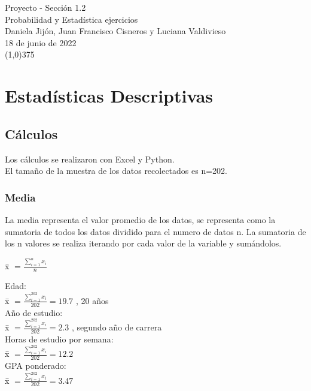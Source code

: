 \documentclass{article}
\begin{document}
\linespread{2}
\begin{center}
 	{\Huge Proyecto - Sección 1.2}\\
	 \vspace{0.75cm}
	 {\large Probabilidad y Estadística ejercicios}\\
	 \vspace{0.5cm}
 	{\large Daniela Jijón, Juan Francisco Cisneros y Luciana Valdivieso}\\
	\vspace{0.5cm}
 	{\large 18 de junio de 2022}\\
	\vspace{0.5cm}
 	\line(1,0){375}
	\vspace{0.5cm}
\end{center}
	
\section*{Estadísticas Descriptivas}
\subsection*{Cálculos}
Los cálculos se realizaron con Excel y Python.\\El tamaño de la muestra de los datos recolectados es n=202. 
\subsubsection*{Media}
La media representa el valor promedio de los datos, se representa como la sumatoria de todos los datos dividido para el numero de datos n. La sumatoria de los n valores se realiza iterando por cada valor de la variable y sumándolos.
\begin{center}
	\=x $= \frac{\sum_{i=1}^n x_{i}}{n}$\\
\end{center}
Edad: \\                                           \=x $= \frac{\sum_{i=1}^{202}  x_{i}}{202} = 19.7$ ,  20 años \vspace{0.25cm} \\
Año de estudio:\\                           \=x $=\frac{\sum_{i=1}^{202}  x_{i}}{202} =  2.3$ ,   segundo año de carrera \vspace{0.25cm}\\
Horas de estudio por semana:\\      \=x $= \frac{\sum_{i=1}^{202}  x_{i}}{202} = 12.2$ \vspace{0.25cm}\\
GPA ponderado:\\                         \=x $= \frac{\sum_{i=1}^{202}  x_{i}}{202} =  3.47 $ \vspace{0.25cm}\\
\end{document}
